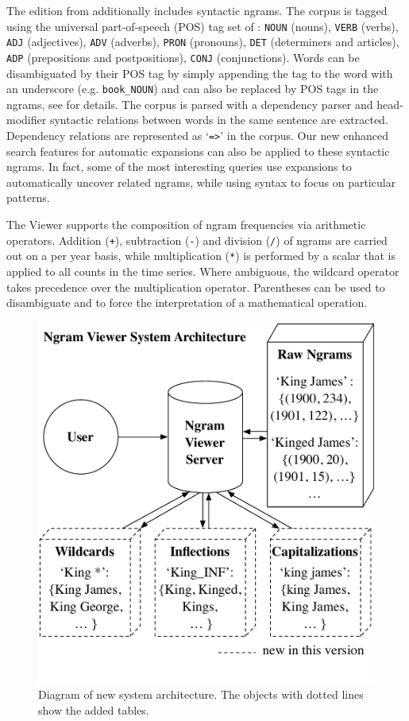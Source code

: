 \documentclass[11pt,a4paper]{article}
\newcommand{\query}[1]{\texttt{#1}}
\begin{document}
The edition from  additionally includes syntactic ngrams. The corpus is tagged using the universal part-of-speech (POS) tag set of : \query{NOUN} (nouns), \query{VERB} (verbs), \query{ADJ} (adjectives), \query{ADV} (adverbs), \query{PRON} (pronouns), \query{DET} (determiners and articles), \query{ADP} (prepositions and postpositions), \query{CONJ} (conjunctions). Words can be disambiguated by their POS tag by simply appending the tag to the word with an underscore (e.g. \texttt{book\_NOUN}) and can also be replaced by POS tags in the ngrams, see  for details. The corpus is  parsed with a dependency parser and head-modifier syntactic relations between words in the same sentence are extracted. Dependency relations are represented as `\query{=>}' in the corpus. Our new enhanced search features for automatic expansions can also be applied to these syntactic ngrams. In fact, some of the most interesting queries use expansions to automatically uncover related ngrams, while using syntax to focus on particular patterns.

The Viewer supports the composition of ngram frequencies via arithmetic operators. Addition (\query{+}), subtraction (\query{-}) and division (\query{/}) of ngrams are carried out on a per year basis, while multiplication (\query{*}) is performed by a scalar that is applied to all counts in the time series. Where ambiguous, the wildcard operator takes precedence over the multiplication operator. Parentheses can be used to disambiguate and to force the interpretation of a mathematical operation.

\begin{figure}[!t]
\includegraphics[width=\columnwidth,keepaspectratio=true]{system_architecture}
\vspace{-2.5em}
\caption{\label{fig:architecture}Diagram of new system architecture. The objects with dotted lines show the added tables.}
\end{figure}
\end{document}
